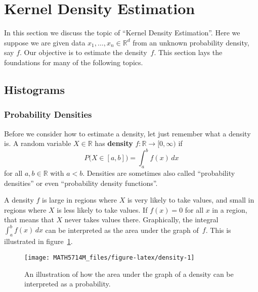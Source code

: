 \documentclass[
  a4paper,
]{article}
\theoremstyle{definition}
\theoremstyle{definition}
\theoremstyle{definition}
\theoremstyle{definition}
\theoremstyle{remark}
\begin{document}
\clearpage

\hypertarget{X01-KDE}{%
\section{Kernel Density Estimation}\label{X01-KDE}}

In this section we discuss the topic of ``Kernel Density Estimation''.
Here we suppose we are given data \(x_1,\ldots, x_n \in\mathbb{R}^d\) from an
unknown probability density, say \(f\). Our objective is to estimate
the density~\(f\). This section lays the foundations for many of the
following topics.

\hypertarget{histograms}{%
\subsection{Histograms}\label{histograms}}

\hypertarget{probability-densities}{%
\subsubsection{Probability Densities}\label{probability-densities}}

Before we consider how to estimate a density, let just remember what a
density is. A random variable \(X \in \mathbb{R}\) has \textbf{density} \(f\colon \mathbb{R}\to [0, \infty)\) if
\begin{equation*}
  P\bigl(X \in [a,b]\bigr)
  = \int_a^b f(x) \,dx
\end{equation*}
for all \(a, b\in\mathbb{R}\) with \(a < b\). Densities are sometimes also called
``probability densities'' or even ``probability density functions''.

A density \(f\) is large in regions where \(X\) is very likely to take
values, and small in regions where \(X\) is less likely to take values.
If \(f(x) = 0\) for all \(x\) in a region, that means that \(X\) never takes
values there. Graphically, the integral \(\int_a^b f(x) \,dx\) can be
interpreted as the area under the graph of~\(f\). This is illustrated
in figure~\ref{fig:density}.



\begin{figure}

{\centering \texttt{[image: MATH5714M\_files/figure-latex/density-1]} 

}

\caption{An illustration of how the area under the graph of a density can be interpreted as a probability.}\label{fig:density}
\end{figure}
\end{document}
